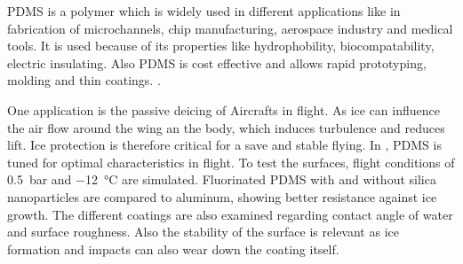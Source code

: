 
PDMS is a polymer which is widely used in different applications like in fabrication of microchannels, chip manufacturing, aerospace industry and medical tools. 
It is used because of its properties like hydrophobility, biocompatability, electric insulating. Also PDMS is cost effective and allows rapid prototyping, molding and thin coatings. \cite{Wolf.2018}. 

One application is the passive deicing of Aircrafts in flight. As ice can influence the air flow around the wing an the body, which induces turbulence and reduces lift. Ice protection is therefore critical for a save and stable flying. In \cite{Liu.2018}, PDMS is tuned for optimal characteristics in flight. To test the surfaces, flight conditions of \SI{0.5}{\bar} and \SI{-12}{\degreeCelsius} are simulated. Fluorinated PDMS with and without silica nanoparticles are compared to aluminum, showing better resistance against ice growth. The different coatings are also examined regarding contact angle of water and surface roughness. Also the stability of the surface is relevant as ice formation and impacts can also wear down the coating itself.  



